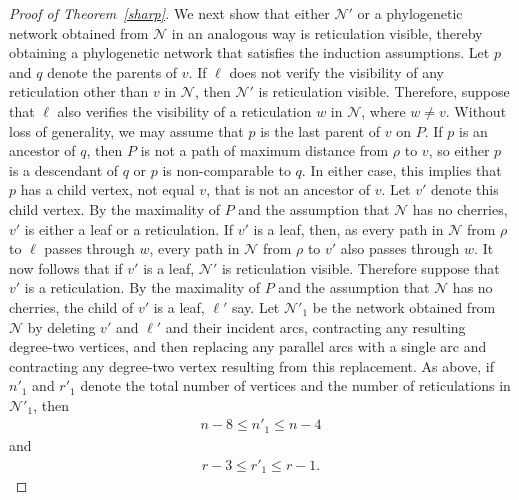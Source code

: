 \documentclass[11pt]{amsart}
\begin{document}
\begin{proof}[Proof of Theorem~\ref{sharp}]
We next show that either ${{\mathcal N}}'$ or a phylogenetic network obtained from ${{\mathcal N}}$ in an analogous way is reticulation visible, thereby obtaining a phylogenetic network that satisfies the induction assumptions. Let $p$ and $q$ denote the parents of $v$. If $\ell$ does not verify the visibility of any reticulation other than $v$ in ${{\mathcal N}}$, then ${{\mathcal N}}'$ is reticulation visible. Therefore, suppose that $\ell$ also verifies the visibility of a reticulation $w$ in ${{\mathcal N}}$, where $w\neq v$. Without loss of generality, we may assume that $p$ is the last parent of $v$ on $P$. If $p$ is an ancestor of $q$, then $P$ is not a path of maximum distance from $\rho$ to $v$, so either $p$ is a descendant of $q$ or $p$ is non-comparable to $q$. In either case, this implies that $p$ has a child vertex, not equal $v$, that is not an ancestor of $v$. Let $v'$ denote this child vertex. By the maximality of $P$ and the assumption that ${{\mathcal N}}$ has no cherries, $v'$ is either a leaf or a reticulation. If $v'$ is a leaf, then, as every path in ${{\mathcal N}}$ from $\rho$ to $\ell$ passes through $w$, every path in ${{\mathcal N}}$ from $\rho$ to $v'$ also passes through $w$. It now follows that if $v'$ is a leaf, ${{\mathcal N}}'$ is reticulation visible. Therefore suppose that $v'$  is a reticulation. By the maximality of $P$ and the assumption that ${{\mathcal N}}$ has no cherries, the child of $v'$ is a leaf, $\ell'$ say. Let ${{\mathcal N}}'_1$ be the network obtained from ${{\mathcal N}}$ by deleting $v'$ and $\ell'$ and their incident arcs, contracting any resulting degree-two vertices, and then replacing any parallel arcs with a single arc and contracting any degree-two vertex resulting from this replacement. As above, if $n'_1$ and $r'_1$ denote the total number of vertices and the number of reticulations in ${{\mathcal N}}'_1$, then
\begin{align*}
n-8\le n'_1\le n-4
\end{align*}
and
\begin{align*}
r-3\le r'_1\le r-1.
\end{align*}


\end{proof}
\end{document}
